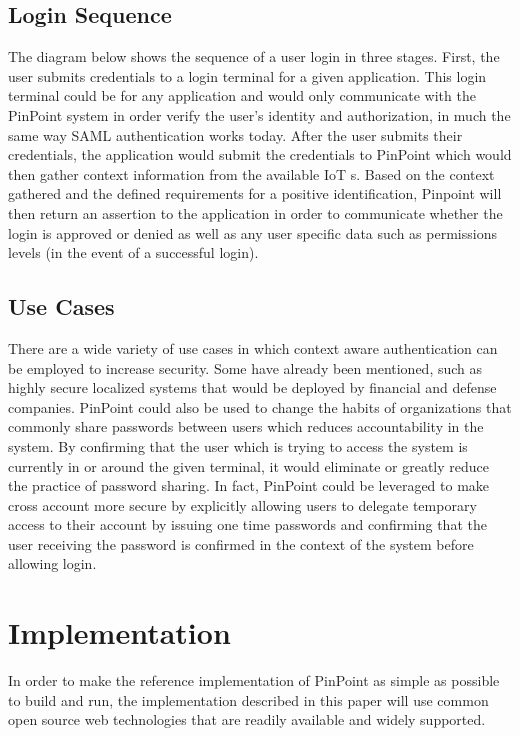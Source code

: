 \documentclass[11pt,journal]{IEEEtran}
\begin{document}
\subsection{Login Sequence}
The diagram below shows the sequence of a user login in three stages.  First, the user submits credentials to a login terminal for a given application.  This login terminal could be for any application and would only communicate with the PinPoint system in order verify the user’s identity and authorization, in much the same way SAML authentication works today.  After the user submits their credentials, the application would submit the credentials to PinPoint which would then gather context information from the available IoT s.  Based on the context gathered and the defined requirements for a positive identification, Pinpoint will then return an assertion to the application in order to communicate whether the login is approved or denied as well as any user specific data such as permissions levels (in the event of a successful login).

\subsection{Use Cases}
There are a wide variety of use cases in which context aware authentication can be employed to increase security.  Some have already been mentioned, such as highly secure localized systems that would be deployed by financial and defense companies.  PinPoint could also be used to change the habits of organizations that commonly share passwords between users which reduces accountability in the system.  By confirming that the user which is trying to access the system is currently in or around the given terminal, it would eliminate or greatly reduce the practice of password sharing.  In fact, PinPoint could be leveraged to make cross account more secure by explicitly allowing users to delegate temporary access to their account by issuing one time passwords and confirming that the user receiving the password is confirmed in the context of the system before allowing login.

\section{Implementation}
In order to make the reference implementation of PinPoint as simple as possible to build and run, the implementation described in this paper will use common open source web technologies that are readily available and widely supported.
\end{document}
